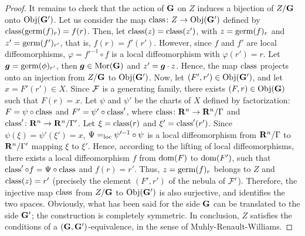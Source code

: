 \begin{proof}
  It remains to check that the action of ${\mathbf G}$ on $Z$ induces a bijection of $Z/{\mathbf G}$ onto ${\operatorname{Obj}}({\mathbf G}')$.
  Let us consider the map $\operatorname{class} \colon Z \to {\operatorname{Obj}}({\mathbf G}')$ defined by $\operatorname{class}(\operatorname{germ}(f)_r) = f(r)$.
  Then,
  let $\operatorname{class}(z)=\operatorname{class}(z')$,
  with $z=\operatorname{germ}(f)_r$ and $z'=\operatorname{germ}(f')_{r'}$,
  that is,
  $f(r)=f'(r')$.
  However,
  since $f$ and $f'$ are local diffeomorphisms,
  $\varphi = f'^{-1} \circ f$ is a local diffeomorphism with $\varphi(r') = r$.
  Let ${\boldsymbol g} = \operatorname{germ}(\phi)_{r'}$,
  then ${\boldsymbol g} \in {\operatorname{Mor}}({\mathbf G})$ and $z'={\boldsymbol g} \cdot z$.
  Hence,
  the map $\operatorname{class}$ projects onto an injection from $Z/{\mathbf G}$ to ${\operatorname{Obj}}({\mathbf G}')$.
  Now,
  let $(F',r') \in {\operatorname{Obj}}({\mathbf G}')$,
  and let $x = F'(r') \in X$.
  Since $\mathcal{F}$ is a generating family,
  there exists $(F,r) \in {\operatorname{Obj}}({\mathbf G})$ such that $F(r)=x$.
  Let $\psi$ and $\psi'$ be the charts of $X$ defined by factorization:
  $F = \psi \circ \operatorname{class}$ and $F' = \psi' \circ \operatorname{class}'$,
  where $\operatorname{class} \colon \mathbf{R}^n \to \mathbf{R}^n/\Gamma$ and $\operatorname{class}' \colon \mathbf{R}^n \to \mathbf{R}^n/\Gamma'$.
  Let $\xi = \operatorname{class}(r)$ and $\xi' = \operatorname{class}'(r')$.
  Since $\psi(\xi) = \psi'(\xi') = x$,
  $\Psi =_{\mathrm{loc}} \psi'^{-1} \circ \psi$ is a local diffeomorphism from $\mathbf{R}^n/\Gamma$ to $\mathbf{R}^n/\Gamma'$ mapping $\xi$ to $\xi'$.
  Hence,
  according to the lifting of local diffeomorphisms,
  there exists a local diffeomorphism $f$ from $\mathrm{dom}(F)$ to $\mathrm{dom}(F')$,
  such that $\operatorname{class}' \circ f = \Psi \circ \operatorname{class}$ and $f(r) = r'$.
  Thus,
  $z = \operatorname{germ}(f)_r$ belongs to $Z$ and $\operatorname{class}(z)=r'$ (precisely the element $(F',r')$ of the nebula of $\mathcal{F}'$).
  Therefore,
  the injective map $\operatorname{class}$ from $Z/{\mathbf G}$ to ${\operatorname{Obj}}({\mathbf G}')$ is also surjective,
  and identifies the two spaces.
  Obviously,
  what has been said for the side ${\mathbf G}$ can be translated to the side ${\mathbf G}'$;
  the construction is completely symmetric.
  In conclusion,
  $Z$ satisfies the conditions of a $({\mathbf G},{\mathbf G}')$-equivalence,
  in the sense of Muhly-Renault-Williams.
\end{proof}

